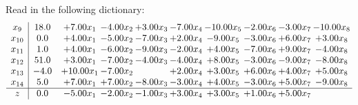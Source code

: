 \documentclass[9pt]{article}
\begin{document}
Read in the following dictionary:
\[\begin{array}{c| c c@{\hskip 2pt} c@{\hskip 2pt} c@{\hskip 2pt} c@{\hskip 2pt} c@{\hskip 2pt} c@{\hskip 2pt} c@{\hskip 2pt} c@{\hskip 2pt} }
 x_{9}   &  18.0 & +  7.00 x_{1} & -4.00 x_{2} & +  3.00 x_{3} & -7.00 x_{4} & -10.00 x_{5} & -2.00 x_{6} & -3.00 x_{7} & -10.00 x_{8}\\
 x_{10}   &  0.0 & +  4.00 x_{1} & -5.00 x_{2} & -7.00 x_{3} & +  2.00 x_{4} & -9.00 x_{5} & -3.00 x_{6} & +  6.00 x_{7} & +  3.00 x_{8}\\
 x_{11}   &  1.0 & +  4.00 x_{1} & -6.00 x_{2} & -9.00 x_{3} & -2.00 x_{4} & +  4.00 x_{5} & -7.00 x_{6} & +  9.00 x_{7} & -4.00 x_{8}\\
 x_{12}   &  51.0 & +  3.00 x_{1} & -7.00 x_{2} & -4.00 x_{3} & -4.00 x_{4} & +  8.00 x_{5} & -3.00 x_{6} & -9.00 x_{7} & -8.00 x_{8}\\
 x_{13}   &  -4.0 & + 10.00 x_{1} & -7.00 x_{2} &   & +  2.00 x_{4} & +  3.00 x_{5} & +  6.00 x_{6} & +  4.00 x_{7} & +  5.00 x_{8}\\
 x_{14}   &  5.0 & +  7.00 x_{1} & +  7.00 x_{2} & -8.00 x_{3} & -3.00 x_{4} & +  4.00 x_{5} & -3.00 x_{6} & +  5.00 x_{7} & -9.00 x_{8}\\
\hline
z    &  0.0 & -5.00 x_{1} & -2.00 x_{2} & -1.00 x_{3} & +  3.00 x_{4} & +  3.00 x_{5} & +  1.00 x_{6} & +  5.00 x_{7} &   \\
\end{array}\]
\end{document}

